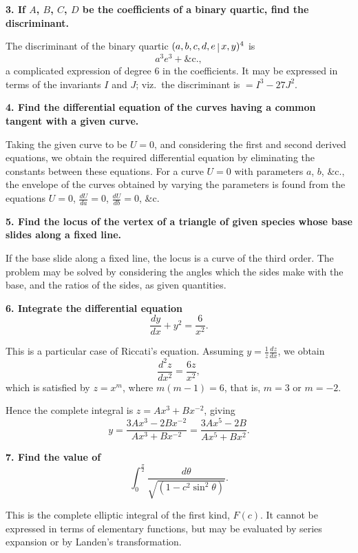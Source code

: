 \documentclass[11pt,a4paper]{article}
\theoremstyle{plain}
\theoremstyle{definition}
\theoremstyle{remark}
\begin{document}
\smallskip

\noindent\textbf{3. If $A$, $B$, $C$, $D$ be the coefficients of a binary quartic, find the discriminant.}

The discriminant of the binary quartic $(a, b, c, d, e \,\raisebox{-0.3ex}{$\vert$}\, x, y)^4$ is
\[
a^3 e^3 + \&\mathrm{c}.,
\]
a complicated expression of degree 6 in the coefficients. It may be expressed in terms of the invariants $I$ and $J$; viz.\ the discriminant is $= I^3 - 27J^2$.

\smallskip

\noindent\textbf{4. Find the differential equation of the curves having a common tangent with a given curve.}

Taking the given curve to be $U = 0$, and considering the first and second derived equations, we obtain the required differential equation by eliminating the constants between these equations. For a curve $U = 0$ with parameters $a$, $b$, \&c., the envelope of the curves obtained by varying the parameters is found from the equations $U = 0$, $\frac{dU}{da} = 0$, $\frac{dU}{db} = 0$, \&c.

\smallskip

\noindent\textbf{5. Find the locus of the vertex of a triangle of given species whose base slides along a fixed line.}

If the base slide along a fixed line, the locus is a curve of the third order. The problem may be solved by considering the angles which the sides make with the base, and the ratios of the sides, as given quantities.

\smallskip

\noindent\textbf{6. Integrate the differential equation}
\[
\frac{dy}{dx} + y^2 = \frac{6}{x^2}.
\]

This is a particular case of Riccati's equation. Assuming $y = \frac{1}{z} \frac{dz}{dx}$, we obtain
\[
\frac{d^2z}{dx^2} = \frac{6z}{x^2},
\]
which is satisfied by $z = x^m$, where $m(m-1) = 6$, that is, $m = 3$ or $m = -2$.

Hence the complete integral is $z = Ax^3 + Bx^{-2}$, giving
\[
y = \frac{3Ax^3 - 2Bx^{-2}}{Ax^3 + Bx^{-2}} = \frac{3Ax^5 - 2B}{Ax^5 + Bx^2}.
\]

\smallskip

\noindent\textbf{7. Find the value of}
\[
\int_0^{\frac{\pi}{2}} \frac{d\theta}{\sqrt{(1 - c^2 \sin^2 \theta)}}.
\]

This is the complete elliptic integral of the first kind, $F(c)$. It cannot be expressed in terms of elementary functions, but may be evaluated by series expansion or by Landen's transformation.
\end{document}

